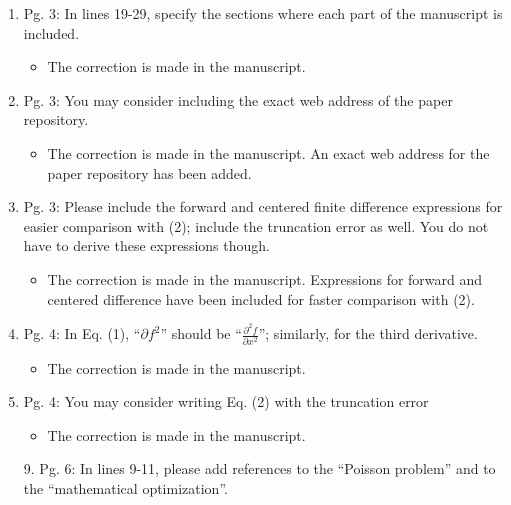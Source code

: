 \documentclass{article}
\begin{document}
\begin{enumerate}
  \item 
	Pg. 3: In lines 19-29, specify the sections where each part of the manuscript is
included.

{\color{red}  
\begin{itemize}
     \item
      The correction is made in the manuscript.
  \end{itemize}}

  \item 
Pg. 3: You may consider including the exact web address of the paper repository.

{\color{red}  
\begin{itemize}
     \item
      The correction is made in the manuscript. An exact web address for the paper repository has been added.
  \end{itemize}}

  \item 
Pg. 3: Please include the forward and centered ﬁnite difference expressions for
easier comparison with (2); include the truncation error as well. You do not have to
derive these expressions though.

{\color{red}  
\begin{itemize}
     \item
      The correction is made in the manuscript. Expressions for forward and centered difference have been included for faster comparison with (2).  
  \end{itemize}}

  \item 
Pg. 4: In Eq. (1), “$\partial f^2$” should be “$\frac{\partial^2 f}{\partial x^2}$”; similarly, for the third derivative.

{\color{red}  
\begin{itemize}
     \item
      The correction is made in the manuscript.
  \end{itemize}}

  \item 
Pg. 4: You may consider writing Eq. (2) with the truncation error

{\color{red}  
\begin{itemize}
     \item
      The correction is made in the manuscript.
  \end{itemize}}



9. Pg. 6: In lines 9-11, please add references to the “Poisson problem” and to the
“mathematical optimization”.


\end{enumerate}
\end{document}
